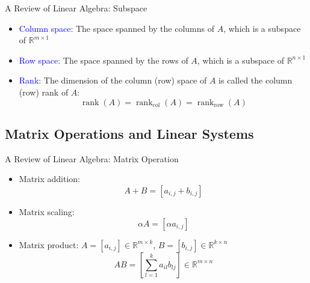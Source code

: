 \documentclass[aspectratio=169,hyperref,UTF8,CJK]{beamer}
\newcommand{\R}{\mathbb{R}}
\begin{document}
\begin{frame}{A Review of Linear Algebra: Subspace}
  \begin{itemize}
    \item \textcolor{blue}{Column space}: The space spanned by the columns of $A$, which is a subspace of $\R^{m\times1}$
    \item \textcolor{blue}{Row space}: The space spanned by the rows of $A$, which is a subspace of $\R^{n\times1}$
    \item \textcolor{blue}{Rank}: The dimension of the column (row) space of $A$ is called the column (row) rank of $A$:
      \begin{equation*}
        \operatorname{rank}(A)=\operatorname{rank}_{\mathrm{col}}(A)
        =\operatorname{rank}_{\mathrm{row}}(A)
      \end{equation*}
  \end{itemize}
\end{frame}

\subsection{Matrix Operations and Linear Systems}

\begin{frame}{A Review of Linear Algebra: Matrix Operation}
  \begin{itemize}
    \item Matrix addition:
      \begin{equation*}A+B=[a_{i,j}+b_{i,j}]\end{equation*}
    \item Matrix scaling:
      \begin{equation*}\alpha A=[\alpha a_{i,j}]\end{equation*}
    \item Matrix product: $A=[a_{i,j}]\in\R^{m\times k}$, $B=[b_{i,j}]\in\R^{k\times n}$
      \begin{equation*}
        AB=\left[\sum_{l=1}^{k}a_{il}b_{lj}\right]\in\R^{m\times n}
      \end{equation*}
  \end{itemize}
\end{frame}
\end{document}
